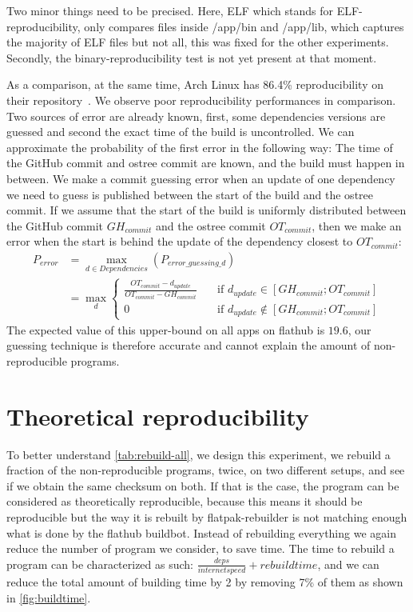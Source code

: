 \documentclass[a4paper,11pt,oneside]{report}
\theoremstyle{definition}
\newcommand{\sysname}{flatpak-rebuilder\xspace}
\newcommand{\fh}{flathub\xspace}
\newcommand{\fhbb}{flathub buildbot\xspace}
\begin{document}
Two minor things need to be precised. Here, ELF which stands for
ELF-reproducibility, only compares files inside /app/bin and /app/lib, which
captures the majority of ELF files but not all, this was fixed for the other
experiments. Secondly, the binary-reproducibility test is not yet present at
that moment.

As a comparison, at the same time, Arch Linux has 86.4\% reproducibility on
their repository~\cite{arch-rebuilderd}. We observe poor reproducibility
performances in comparison. Two sources of error are already known, first, some
dependencies versions are guessed and second the exact time of the build is
uncontrolled. We can approximate the probability of the first error in the
following way: The time of the GitHub commit and ostree commit are known, and
the build must happen in between. We make a commit guessing error when an
update of one dependency we need to guess is published between the start of the
build and the ostree commit. If we assume that the start of the build is
uniformly distributed between the GitHub commit $GH_{commit}$ and the ostree
commit $OT_{commit}$, then we make an error when the start is behind the update
of the dependency closest to $OT_{commit}$:
\begin{align}
    P_{error} &= \max_{d \in Dependencies}(P_{error\_guessing\_d}) \\
              &= \max_{d}
              \begin{cases}
                \frac{OT_{commit} - d_{update}}{OT_{commit} -
                    GH_{commit}}  & \quad \text{if } d_{update}
                    \in [GH_{commit}; OT_{commit}] \\
                0  & \quad \text{if } d_{update}
                  \notin [GH_{commit}; OT_{commit}]
              \end{cases}
\end{align}
The expected value of this upper-bound on all apps on \fh is $19.6$, our
guessing technique is therefore accurate and cannot explain the amount of
non-reproducible programs.


\section{Theoretical reproducibility}
\label{sec:theo-repro}
To better understand \autoref{tab:rebuild-all}, we design this experiment, we
rebuild a fraction of the non-reproducible programs, twice, on two different
setups, and see if we obtain the same checksum on both. If that is the case,
the program can be considered as theoretically reproducible, because this means
it should be reproducible but the way it is rebuilt by \sysname is not matching
enough what is done by the \fhbb. Instead of rebuilding everything we again
reduce the number of program we consider, to save time. The time to rebuild a
program can be characterized as such: $\frac{deps}{internet speed} + rebuild
time$, and we can reduce the total amount of building time by 2 by removing 7\%
of them as shown in \autoref{fig:buildtime}.
\end{document}
